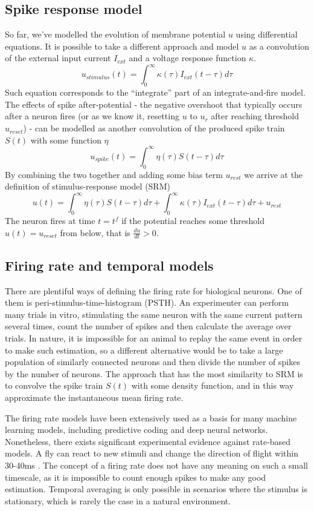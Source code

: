 \documentclass[oneside,english,logo]{amuthesis}
\begin{document}
\subsection{Spike response model}

So far, we've modelled the evolution of membrane potential $u$ using differential equations. It is possible to take a different approach and model $u$ as a convolution of the external input current $I_{ext}$ and a voltage response function $\kappa$.
\[
u_{stimulus}(t) = \int_{0}^{\infty} \kappa(\tau) I_{ext} (t-\tau) d\tau
\]
Such equation corresponds to the ``integrate'' part of an integrate-and-fire model. The effects of spike after-potential - the negative overshoot that typically occurs after a neuron fires (or as we know it, resetting $u$ to $u_r$ after reaching threshold $u_{reset}$) - can be modelled as another convolution of the produced spike train $S(t)$ with some function $\eta$
\[
u_{spike}(t) = \int_{0}^{\infty} \eta(\tau) S (t-\tau) d\tau
\]
By combining the two together and adding some bias term $u_{rest}$ we arrive at the definition of stimulus-response model (SRM)
\[
u(t) = \int_{0}^{\infty} \eta(\tau) S (t-\tau) d\tau + \int_{0}^{\infty} \kappa(\tau) I_{ext} (t-\tau) d\tau + u_{rest}
\]
The neuron fires  at time $t=t^f$ if the potential reaches some threshold $u(t)=u_{reset}$ from below, that is $\frac{du}{dt}>0$.



\subsection{Firing rate and temporal models}

There are plentiful ways of defining the firing rate for biological neurons. 
One of them is peri-stimulus-time-histogram (PSTH). An experimenter can perform many trials in vitro, stimulating the same neuron with the same current pattern several times, count the number of spikes and then calculate the average over trials. In nature, it is impossible for an animal to replay the same event in order to make such estimation, so a different alternative would be to take a large population of similarly connected neurons and then divide the number of spikes by the number of neurons. The approach that has the most similarity to SRM is to convolve the spike train $S(t)$ with some density function, and in this way approximate the instantaneous mean firing rate. 

The firing rate models have been extensively used as a basis for many machine learning models, including predictive coding and deep neural networks. Nonetheless, there exists significant experimental evidence against rate-based models. A fly can react to new stimuli and change the direction of flight within 30-40ms \cite{Rieke}. The concept of a firing rate does not have any meaning on such a small timescale, as it is impossible to count enough spikes to make any good estimation. Temporal averaging is only possible in scenarios where the stimulus is stationary, which is rarely the case in a natural environment.
\end{document}
